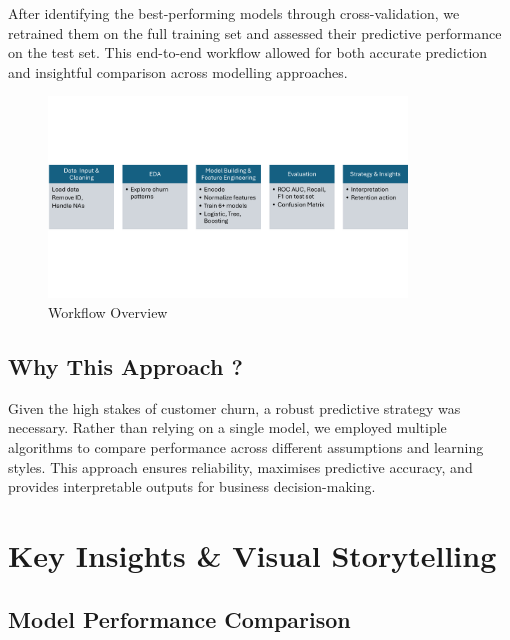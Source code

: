 \documentclass[
  letterpaper,
  DIV=11,
  numbers=noendperiod]{scrartcl}
\begin{document}
After identifying the best-performing models through cross-validation,
we retrained them on the full training set and assessed their predictive
performance on the test set. This end-to-end workflow allowed for both
accurate prediction and insightful comparison across modelling
approaches.

\begin{figure}[H]

{\centering \includegraphics[width=0.85\textwidth,height=\textheight]{Output/Workflow Overview.png}

}

\caption{Workflow Overview}

\end{figure}%

\subsection{Why This Approach ?}\label{why-this-approach}

Given the high stakes of customer churn, a robust predictive strategy
was necessary. Rather than relying on a single model, we employed
multiple algorithms to compare performance across different assumptions
and learning styles. This approach ensures reliability, maximises
predictive accuracy, and provides interpretable outputs for business
decision-making.

\newpage

\section{Key Insights \& Visual
Storytelling}\label{key-insights-visual-storytelling}

\subsection{Model Performance
Comparison}\label{model-performance-comparison}
\end{document}
